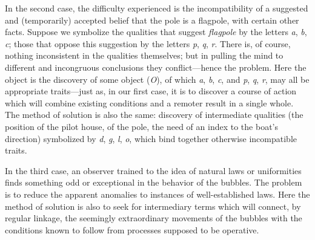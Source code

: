 \documentclass[showtrims,ustradepaper]{memoir}
\begin{document}

In the second case, the difficulty experienced is the incompatibility of
a suggested and (temporarily) accepted belief that the pole is a
flagpole, with certain other facts. Suppose we symbolize the qualities
that suggest \emph{flagpole} by the letters \emph{a}, \emph{b},
\emph{c}; those that oppose this suggestion by the letters \emph{p},
\emph{q}, \emph{r}. There is, of course, nothing inconsistent in the
qualities themselves; but in pulling the mind to different and
incongruous conclusions they conflict---hence the problem. Here the
object is the discovery of some object (\emph{O}), of which \emph{a},
\emph{b}, \emph{c}, and \emph{p}, \emph{q}, \emph{r}, may all be
appropriate traits---just as, in our first case, it is to discover a
course of action which will combine existing conditions and a remoter
result in a single whole. The method of solution is also the same:
discovery of intermediate qualities (the position of the pilot house, of
the pole, the need of an index to the boat's direction) symbolized by
\emph{d}, \emph{g}, \emph{l}, \emph{o}, which bind together otherwise
incompatible traits.


In the third case, an observer trained to the idea of natural laws or
uniformities finds something odd or exceptional in the behavior of the
bubbles. The problem is to reduce the apparent anomalies to instances of
well-established laws. Here the method of solution is also to seek for
intermediary terms which will connect, by regular linkage, the seemingly
extraordinary movements of the bubbles with the conditions known to
follow from processes supposed to be operative.

\end{document}
